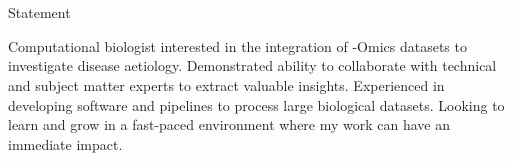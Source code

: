 \section{\faGears}{Statement}
 \vspace{3pt}
 \resumeEntryStart
  {\small Computational biologist interested in the integration of -Omics datasets to investigate disease aetiology. Demonstrated ability to collaborate with technical and subject matter experts to extract valuable insights. Experienced in developing software and pipelines to process large biological datasets. Looking to learn and grow in a fast-paced environment where my work can have an immediate impact.\par}
 \resumeEntryEnd
